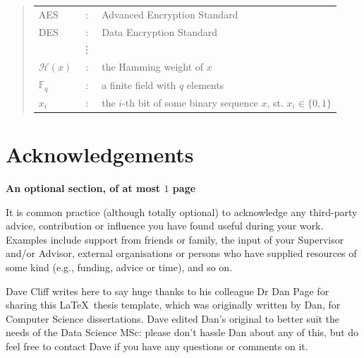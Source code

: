 \documentclass{dissertation}
\begin{document}
\begin{quote}
\noindent
\begin{tabular}{lcl}
AES                 &:     & Advanced Encryption Standard                                         \\
DES                 &:     & Data Encryption Standard                                             \\
                    &\vdots&                                                                      \\
${\mathcal H}( x )$ &:     & the Hamming weight of $x$                                            \\
${\mathbb  F}_q$    &:     & a finite field with $q$ elements                                     \\
$x_i$               &:     & the $i$-th bit of some binary sequence $x$, st. $x_i \in \{ 0, 1 \}$ \\
\end{tabular}
\end{quote}


\chapter*{Acknowledgements}

{\bf An optional section, of at most $1$ page}
\vspace{1cm} 

\noindent
It is common practice (although totally optional) to acknowledge any
third-party advice, contribution or influence you have found useful
during your work.  Examples include support from friends or family, 
the input of your Supervisor and/or Advisor, external organisations 
or persons who  have supplied resources of some kind (e.g., funding, 
advice or time), and so on.

\vspace{1cm}
Dave Cliff writes here to say huge thanks to his colleague Dr Dan Page for sharing this \LaTeX\ thesis template, which was originally written by Dan, for Computer Science dissertations. Dave edited Dan's original to better suit the needs of the Data Science MSc: please don't hassle Dan about any of this, but do feel free to contact Dave if you have any questions or comments on it.  

\end{document}
